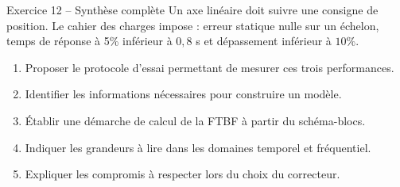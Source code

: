 \begin{TLExercise}{Exercice 12 -- Synthèse complète}
Un axe linéaire doit suivre une consigne de position. Le cahier des charges impose : erreur statique nulle sur un échelon, temps de réponse à 5\% inférieur à $0{,}8$ s et dépassement inférieur à $10\%$.
\begin{enumerate}
  \item Proposer le protocole d'essai permettant de mesurer ces trois performances.
  \item Identifier les informations nécessaires pour construire un modèle.
  \item Établir une démarche de calcul de la FTBF à partir du schéma-blocs.
  \item Indiquer les grandeurs à lire dans les domaines temporel et fréquentiel.
  \item Expliquer les compromis à respecter lors du choix du correcteur.
\end{enumerate}
\end{TLExercise}
